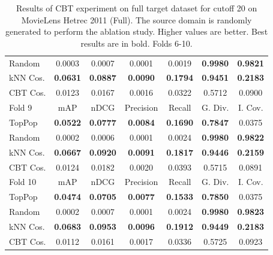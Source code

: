 \begin{table}[hbt]
\begin{tabulary}{\textwidth}{|L|CCCCCC|}
Random & 0.0003 &           0.0007 &           0.0001 &           0.0019 &                                  \textbf{0.9980} &                                   \textbf{0.9821} \\
kNN Cos. & \textbf{0.0631} &  \textbf{0.0887} &  \textbf{0.0090} &  \textbf{0.1794} &                                  \textbf{0.9451} &                                   \textbf{0.2183} \\
CBT Cos. & 0.0123 &           0.0167 &           0.0016 &           0.0322 &                                           0.5712 &                                            0.0900 \\
\hline
\hline
Fold 9 & mAP & nDCG & Precision & Recall & G. Div. & I. Cov. \\
\hline
TopPop & \textbf{0.0522} &  \textbf{0.0777} &  \textbf{0.0084} &  \textbf{0.1690} &                                  \textbf{0.7847} &                                            0.0375 \\
Random & 0.0002 &           0.0006 &           0.0001 &           0.0024 &                                  \textbf{0.9980} &                                   \textbf{0.9822} \\
kNN Cos. & \textbf{0.0667} &  \textbf{0.0920} &  \textbf{0.0091} &  \textbf{0.1817} &                                  \textbf{0.9446} &                                   \textbf{0.2159} \\
CBT Cos. & 0.0124 &           0.0182 &           0.0020 &           0.0393 &                                           0.5715 &                                            0.0891 \\
\hline
\hline
Fold 10 & mAP & nDCG & Precision & Recall & G. Div. & I. Cov. \\
\hline
TopPop & \textbf{0.0474} &  \textbf{0.0705} &  \textbf{0.0077} &  \textbf{0.1533} &                                  \textbf{0.7850} &                                            0.0375 \\
Random & 0.0002 &           0.0007 &           0.0001 &           0.0024 &                                  \textbf{0.9980} &                                   \textbf{0.9823} \\
kNN Cos. & \textbf{0.0683} &  \textbf{0.0953} &  \textbf{0.0096} &  \textbf{0.1912} &                                  \textbf{0.9449} &                                   \textbf{0.2183} \\
CBT Cos. & 0.0112 &           0.0161 &           0.0017 &           0.0336 &                                           0.5725 &                                            0.0923 \\
\hline
\end{tabulary}
\caption{Results of CBT experiment on full target dataset for cutoff 20 on MovieLens Hetrec 2011 (Full). The source domain is randomly generated to perform the ablation study. Higher values are better. Best results are in bold. Folds 6-10.}
\end{table}

